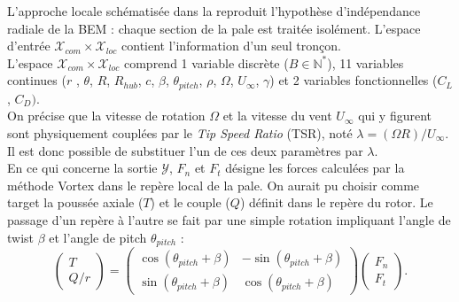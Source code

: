 \documentclass[11pt, a4paper]{article}
\begin{document}
L'approche locale schématisée dans la  reproduit l'hypothèse d'indépendance radiale de la BEM : chaque section de la pale est traitée isolément. L'espace d'entrée $\mathcal{X}_{com}\times \mathcal{X}_{loc}$ contient l'information d'un seul tronçon. \\

L'espace $\mathcal{X}_{com}\times\mathcal{X}_{loc}$ comprend 1 variable discrète ($B \in \mathbb{N}^*$), 11 variables continues ($r$ , $\theta$, $R$, $R_{hub}$, $c$, $\beta$, $\theta_{pitch}$, $\rho$, $\Omega$, $U_\infty$, $\gamma$) et 2 variables fonctionnelles ($C_L$, $C_D)$. \\

On précise que la vitesse de rotation $\Omega$ et la vitesse du vent $U_\infty$ qui y figurent sont physiquement couplées par le \textit{Tip Speed Ratio} (TSR), noté $\lambda = (\Omega R)/U_\infty$. Il est donc possible de substituer l'un de ces deux paramètres par $\lambda$. \\

En ce qui concerne la sortie $\mathcal{Y}$, $F_n$ et $F_t$ désigne les forces calculées par la méthode Vortex dans le repère local de la pale. On aurait pu choisir comme target la poussée axiale ($T$) et le couple ($Q$) définit dans le repère du rotor. Le passage d'un repère à l'autre se fait par une simple rotation impliquant l'angle de twist $\beta$ et l'angle de pitch $\theta_{pitch}$ :
    $$ \begin{pmatrix} T \\ Q/r \end{pmatrix} = \begin{pmatrix} \cos(\theta_{pitch} + \beta) & -\sin(\theta_{pitch} + \beta) \\ \sin(\theta_{pitch} + \beta) & \cos(\theta_{pitch} + \beta) \end{pmatrix} \begin{pmatrix} F_n \\ F_t \end{pmatrix}.$$
\end{document}
